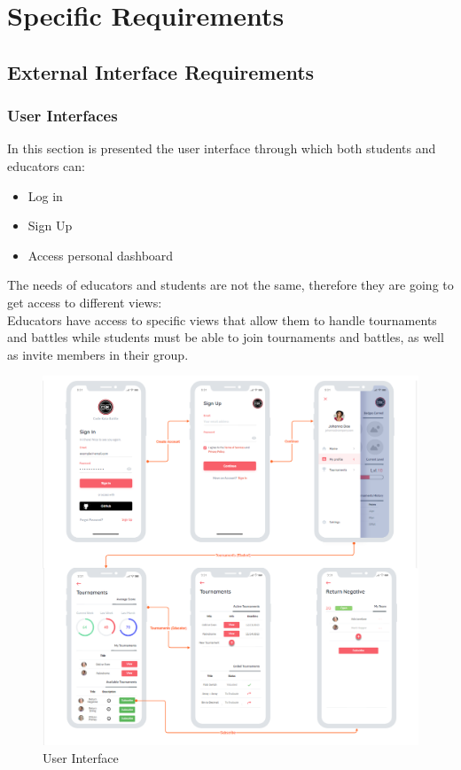 \documentclass{article}
\begin{document}
\section{Specific Requirements}
\subsection{External Interface Requirements}
\subsubsection{User Interfaces}
In this section is presented the user interface through which both students and educators can:
\begin{itemize}
    \item Log in
    \item Sign Up
    \item Access personal dashboard
\end{itemize}
The needs of educators and students are not the same, therefore they are going to get access to different views:\\
Educators have access to specific views that allow them to handle tournaments and battles while students must be able to join tournaments and battles, as well as invite members in their group.



\begin{figure}
    \hspace*{-2cm}
    \includegraphics[scale=1.5]{UI.png}
    \caption{User Interface}
\end{figure}
\newpage
\end{document}
